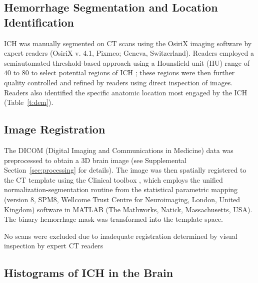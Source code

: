 \documentclass[10pt]{article}\usepackage[]{graphicx}\usepackage[]{color}
\begin{document}
\subsection{Hemorrhage Segmentation and Location Identification}
ICH was manually segmented on CT scans using the OsiriX imaging software by expert readers (OsiriX v. 4.1, Pixmeo; Geneva, Switzerland).  Readers employed a semiautomated threshold-based approach using a Hounsfield unit (HU) range of $40$ to $80$ to select potential regions of ICH \citep{bergstrom_variation_1977, smith_imaging_2006}; these regions were then further quality controlled and refined by readers using direct inspection of images.  Readers also identified the specific anatomic location most engaged by the ICH (Table~\ref{t:dem}).

\subsection{Image Registration}
The DICOM (Digital Imaging and Communications in Medicine) data was preprocessed to obtain a 3D brain image (see Supplemental Section~\ref{sec:processing} for details).
The image was then spatially registered to the CT template using the Clinical toolbox \citep{rorden_age-specific_2012}, which employs the unified normalization-segmentation routine \citep{ashburner_unified_2005} from the statistical parametric mapping (version 8, SPM8, Wellcome Trust Centre for Neuroimaging, London, United Kingdom) software in MATLAB (The Mathworks, Natick, Massachusetts, USA).  The binary hemorrhage mask was transformed into the template space.  

No scans were excluded due to inadequate registration determined by visual inspection by expert CT readers


%





\subsection{Histograms of ICH in the Brain}
\end{document}
